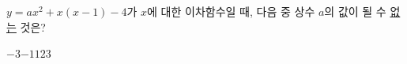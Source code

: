 $y=ax^2+x(x-1)-4$가 $x$에 대한 이차함수일 때, 다음 중 상수 $a$의 값이 될 수 \underline{없는} 것은?
\begin{choices32}{$-3$}{$-1$}{$1$}{$2$}{$3$}\end{choices32}
